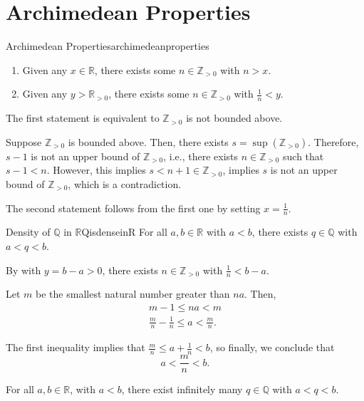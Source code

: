 
\section{Archimedean Properties}

\begin{thm}{Archimedean Properties}{archimedeanproperties}
	\begin{enumerate}
		\item Given any \(x \in \mathbb{R}\), there exists some \(n \in \mathbb{Z}_{>0}\) with \(n > x\).
		\item Given any \(y > \mathbb{R}_{>0}\), there exists some \(n \in \mathbb{Z}_{>0}\) with \(\frac{1}{n} < y\).
	\end{enumerate}
\end{thm}

\begin{dem}{}{}
	The first statement is equivalent to \(\mathbb{Z}_{>0}\) is not bounded above.

	Suppose \(\mathbb{Z}_{>0}\) is bounded above. Then, there exists \(s = \sup(\mathbb{Z}_{>0})\). Therefore, \(s - 1\) is not an upper bound of \(\mathbb{Z}_{>0}\), i.e., there exists \(n \in \mathbb{Z}_{>0}\) such that \(s - 1 < n\). However, this implies \(s < n + 1\in \mathbb{Z}_{>0}\), implies \(s\) is not an upper bound of \(\mathbb{Z}_{>0}\), which is a contradiction.

	The second statement follows from the first one by setting \(x = \frac{1}{n}\).
\end{dem}

\begin{thm}{Density of \(\mathbb{Q}\) in \(\mathbb{R}\)}{QisdenseinR}
	For all \(a, b \in \mathbb{R}\) with \(a < b\), there exists \(q \in \mathbb{Q}\) with \(a < q < b\).
\end{thm}

\begin{dem}{}{}
	By  with \(y = b - a > 0\), there exists  \(n \in \mathbb{Z}_{>0}\) with \(\frac{1}{n} < b - a\).

	Let  \(m\) be the smallest natural number greater than \(na\). Then,
	\begin{gather*}
		m-1 \leq na < m \\
		\frac{m}{n} - \frac{1}{n} \leq a < \frac{m}{n}.
	\end{gather*}

	The first inequality implies that \(\frac{m}{n} \leq a + \frac{1}{n} < b\), so finally, we conclude that  \[
		a < \frac{m}{n} < b.
	\]
\end{dem}

\begin{cor}{}{}
	For all \(a, b \in \mathbb{R}\), with \(a < b\), there exist infinitely many \(q \in \mathbb{Q}\) with \(a < q < b\).
\end{cor}
